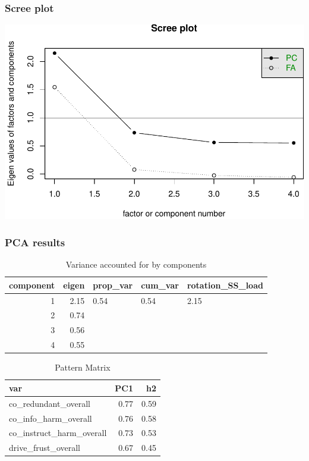 \documentclass[]{article}
\begin{document}
\hypertarget{scree-plot-2}{%
\subsubsection{Scree plot}\label{scree-plot-2}}

\includegraphics{strategy_comms_files/figure-latex/unnamed-chunk-14-1.pdf}

\hypertarget{pca-results-2}{%
\subsubsection{PCA results}\label{pca-results-2}}

\begin{table}[H]

\caption{\label{tab:unnamed-chunk-15}Variance accounted for by components}
\centering
\fontsize{6}{8}\selectfont
\begin{tabular}[t]{rrlll}
\toprule
component & eigen & prop\_var & cum\_var & rotation\_SS\_load\\
\midrule
1 & 2.15 & 0.54 & 0.54 & 2.15\\
2 & 0.74 &  &  & \\
3 & 0.56 &  &  & \\
4 & 0.55 &  &  & \\
\bottomrule
\end{tabular}
\end{table}

\begin{table}[H]

\caption{\label{tab:unnamed-chunk-15}Pattern Matrix}
\centering
\fontsize{6}{8}\selectfont
\begin{tabular}[t]{lrr}
\toprule
var & PC1 & h2\\
\midrule
co\_redundant\_overall & 0.77 & 0.59\\
co\_info\_harm\_overall & 0.76 & 0.58\\
co\_instruct\_harm\_overall & 0.73 & 0.53\\
drive\_frust\_overall & 0.67 & 0.45\\
\bottomrule
\end{tabular}
\end{table}
\end{document}
